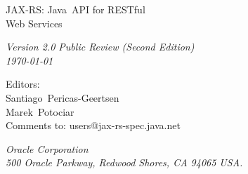 \begin{titlepage}
\raggedleft

\vspace*{60pt}

{\Huge
\textsf{JAX-RS: Java\texttrademark\ API for RESTful\\\vspace{10pt}
 Web Services}}

\vspace{20pt}

{
\Large\textit{Version 2.0 Public Review (Second Edition)\\
\today}
}

\vspace{40pt}

{\large Editors:\\
Santiago\ Pericas-Geertsen\\
Marek\ Potociar\\
\vspace{10pt}Comments to: users@jax-rs-spec.java.net
}

\vspace{80pt}

{\small\textit{Oracle Corporation\\
500 Oracle Parkway, Redwood Shores, CA 94065 USA.}
}
\end{titlepage} 
